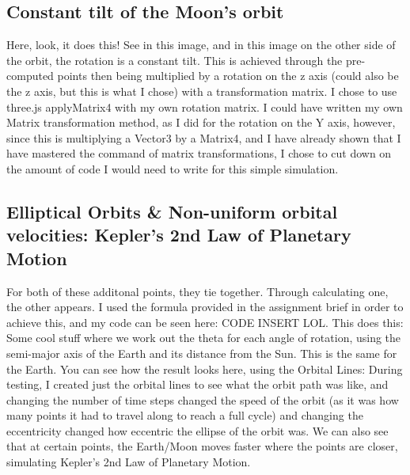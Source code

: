 \documentclass[12pt]{article}
\begin{document}
\subsection{Constant tilt of the Moon's orbit}
Here, look, it does this! See in this image, and in this image on the other side of the orbit, the rotation is a constant tilt. This is achieved through the pre-computed points then being multiplied by a rotation on the z axis (could also be the z axis, but this is what I chose) with a transformation matrix. I chose to use three.js applyMatrix4 with my own rotation matrix. I could have written my own Matrix transformation method, as I did for the rotation on the Y axis, however, since this is multiplying a Vector3 by a Matrix4, and I have already shown that I have mastered the command of matrix transformations, I chose to cut down on the amount of code I would need to write for this simple simulation.

\subsection{Elliptical Orbits \& Non-uniform orbital velocities: Kepler's 2nd Law of Planetary Motion}
For both of these additonal points, they tie together. Through calculating one, the other appears. I used the formula provided in the assignment brief \cite{assignment} in order to achieve this, and my code can be seen here: CODE INSERT LOL. This does this: Some cool stuff where we work out the theta for each angle of rotation, using the semi-major axis of the Earth and its distance from the Sun. This is the same for the Earth. You can see how the result looks here, using the Orbital Lines: During testing, I created just the orbital lines to see what the orbit path was like, and changing the number of time steps changed the speed of the orbit (as it was how many points it had to travel along to reach a full cycle) and changing the eccentricity changed how eccentric the ellipse of the orbit was. We can also see that at certain points, the Earth/Moon moves faster where the points are closer, simulating Kepler's 2nd Law of Planetary Motion.
\end{document}
